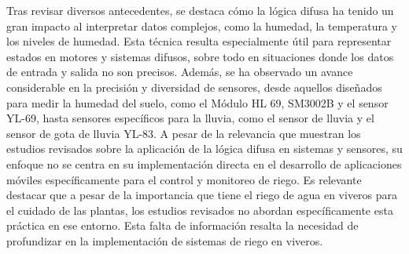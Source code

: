 \bigbreak
Tras revisar diversos antecedentes, se destaca cómo la lógica difusa ha tenido un gran impacto al interpretar datos complejos, como la humedad, la temperatura y los niveles de humedad. Esta técnica resulta especialmente útil para representar estados en motores y sistemas difusos, sobre todo en situaciones donde los datos de entrada y salida no son precisos. Además, se ha observado un avance considerable en la precisión y diversidad de sensores, desde aquellos diseñados para medir la humedad del suelo, como el Módulo HL 69, SM3002B y el sensor YL-69, hasta sensores específicos para la lluvia, como el sensor de lluvia y el sensor de gota de lluvia YL-83.
\bigbreak
A pesar de la relevancia que muestran los estudios revisados sobre la aplicación de la lógica difusa en sistemas y sensores, su enfoque no se centra en su implementación directa en el desarrollo de aplicaciones móviles específicamente para el control y monitoreo de riego.
\bigbreak
Es relevante destacar que a pesar de la importancia que tiene el riego de agua en viveros para el cuidado de las plantas, los estudios revisados no abordan específicamente esta práctica en ese entorno. Esta falta de información resalta la necesidad de profundizar en la implementación de sistemas de riego en viveros.
